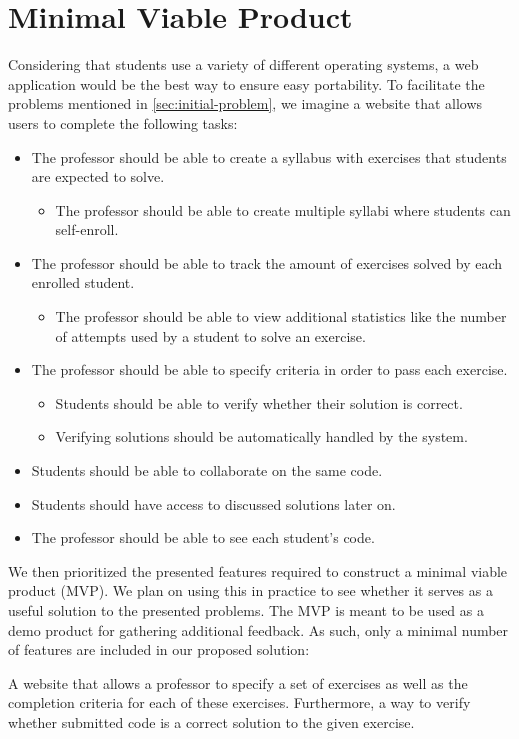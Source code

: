 \section{Minimal Viable Product}
Considering that students use a variety of different operating systems, a web application would be the best way to ensure easy portability.
To facilitate the problems mentioned in \ref{sec:initial-problem}, we imagine a website that allows users to complete the following tasks:
\begin{itemize}
	\item The professor should be able to create a syllabus with exercises that students are expected to solve.
	\begin{itemize}
		\item The professor should be able to create multiple syllabi where students can self-enroll.
	\end{itemize}
	\item The professor should be able to track the amount of exercises solved by each enrolled student.
	\begin{itemize}
		\item The professor should be able to view additional statistics like the number of attempts used by a student to solve an exercise.
	\end{itemize}
	\item The professor should be able to specify criteria in order to pass each exercise.
	\begin{itemize}
		\item Students should be able to verify whether their solution is correct.
		\item Verifying solutions should be automatically handled by the system.
	\end{itemize}
	\item Students should be able to collaborate on the same code.
	\item Students should have access to discussed solutions later on.
	\item The professor should be able to see each student's code.
\end{itemize}

We then prioritized the presented features required to construct a minimal viable product (MVP).
We plan on using this in practice to see whether it serves as a useful solution to the presented problems. 
The MVP is meant to be used as a demo product for gathering additional feedback.
As such, only a minimal number of features are included in our proposed solution:

\begin{displayquote}
A website that allows a professor to specify a set of exercises as well as the completion criteria for each of these exercises. Furthermore, a way to verify whether submitted code is a correct solution to the given exercise.
\end{displayquote}